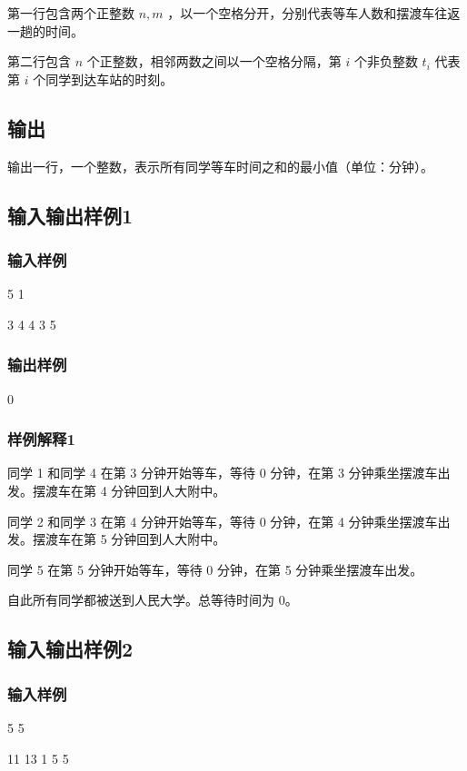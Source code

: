 \documentclass[UTF8]{ctexart}
\begin{document}
第一行包含两个正整数 $n,m$ ，以一个空格分开，分别代表等车人数和摆渡车往返一趟的时间。

第二行包含 $n$ 个正整数，相邻两数之间以一个空格分隔，第 $i$ 个非负整数   $t_i$ 代表第 $i$ 个同学到达车站的时刻。

\subsection{输出}

输出一行，一个整数，表示所有同学等车时间之和的最小值（单位：分钟）。

\subsection{输入输出样例1}
\subsubsection{输入样例}

5 1 

3 4 4 3 5 

\subsubsection{输出样例}

0

\subsubsection{样例解释1}

同学 1 和同学 4 在第 3 分钟开始等车，等待 0 分钟，在第 3 分钟乘坐摆渡车出发。摆渡车在第 4 分钟回到人大附中。

同学 2 和同学 3 在第 4 分钟开始等车，等待 0 分钟，在第 4 分钟乘坐摆渡车出发。摆渡车在第 5 分钟回到人大附中。

同学 5 在第 5 分钟开始等车，等待 0 分钟，在第 5 分钟乘坐摆渡车出发。

自此所有同学都被送到人民大学。总等待时间为 0。

\subsection{输入输出样例2}
\subsubsection{输入样例}

5 5 

11 13 1 5 5 
\end{document}
